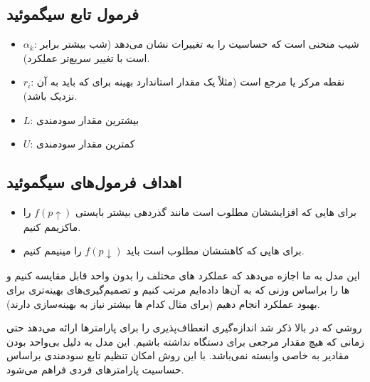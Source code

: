 \subsection{فرمول تابع سیگموئید}


\begin{itemize}
    \item $\alpha_k$: شیب منحنی است که حساسیت را به تغییرات  نشان می‌دهد
    (شب بیشتر برابر است با تغییر سریع‌تر عملکرد).
    \item $r_i$: نقطه مرکز یا مرجع  است (مثلاً یک مقدار استاندارد بهینه
    برای  که  باید به آن نزدیک باشد).
    \item $L$: بیشترین مقدار سودمندی
    \item $U$: کمترین مقدار سودمندی
\end{itemize}

\subsection{اهداف فرمول‌های سیگموئید}

\begin{itemize}
    \item برای هایی که افزایششان مطلوب است مانند گذردهی بیشتر بایستی
    $f(p \uparrow)$ را ماکزیمم کنیم.
    \item برای هایی که کاهششان مطلوب است باید $f(p \downarrow)$ را
    مینیمم کنیم.
\end{itemize}

این مدل به ما اجازه می‌دهد که عملکرد های مختلف را بدون واحد قابل مقایسه
کنیم و ها را براساس وزنی که به آن‌ها داده‌ایم مرتب کنیم و تصمیم‌گیری‌های
بهینه‌تری برای بهبود عملکرد  انجام دهیم (برای مثال کدام ها بیشتر
نیاز به بهینه‌سازی دارند).

روشی که در بالا ذکر شد اندازه‌گیری انعطاف‌پذیری را برای پارامتر‌ها ارائه می‌دهد
حتی زمانی که هیچ مقدار مرجعی برای دستگاه  نداشته باشیم. این مدل به دلیل
بی‌واحد بودن مقادیر به  خاصی وابسته نمی‌باشد. با این روش امکان تنظیم
تابع سودمندی براساس حساسیت پارامتر‌های فردی فراهم می‌شود.